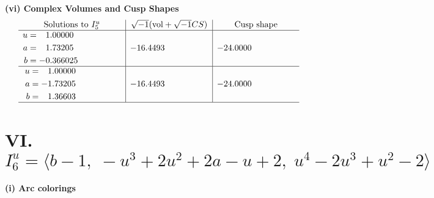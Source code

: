 \documentclass[1p]{elsarticle_modified}
\theoremstyle{definition}
\newcommand{\I}{\sqrt{-1}}
\begin{document}
\newpage\flushleft \textbf{(vi) Complex Volumes and Cusp Shapes}
$$\begin{array}{c|c|c}  
\text{Solutions to }I^u_{5}& \I (\text{vol} + \sqrt{-1}CS) & \text{Cusp shape}\\
 \hline 
\begin{aligned}
u &= \phantom{-}1.00000\phantom{ +0.000000I} \\
a &= \phantom{-}1.73205\phantom{ +0.000000I} \\
b &= -0.366025\phantom{ +0.000000I}\end{aligned}
 & -16.4493\phantom{ +0.000000I} & -24.0000\phantom{ +0.000000I} \\ \hline\begin{aligned}
u &= \phantom{-}1.00000\phantom{ +0.000000I} \\
a &= -1.73205\phantom{ +0.000000I} \\
b &= \phantom{-}1.36603\phantom{ +0.000000I}\end{aligned}
 & -16.4493\phantom{ +0.000000I} & -24.0000\phantom{ +0.000000I}\\
 \hline 
 \end{array}$$\newpage\newpage\renewcommand{\arraystretch}{1}
\centering \section*{VI. $I^u_{6}= \langle b-1,\;- u^3+2 u^2+2 a- u+2,\;u^4-2 u^3+u^2-2 \rangle$}
\flushleft \textbf{(i) Arc colorings}\\
\end{document}
